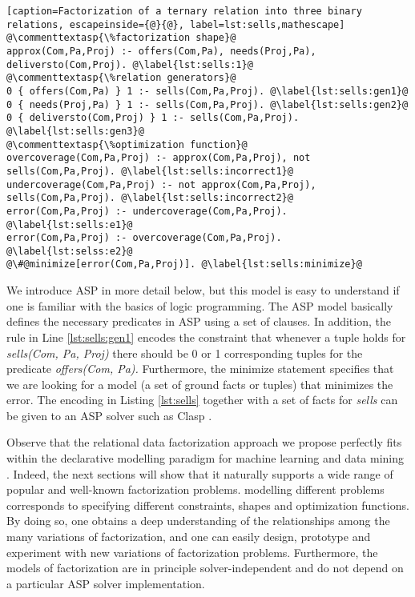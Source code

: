 \begin{lstlisting}[caption=Factorization of a ternary relation into three binary relations, escapeinside={@}{@}, label=lst:sells,mathescape] 
@\commenttextasp{\%factorization shape}@
approx(Com,Pa,Proj) :- offers(Com,Pa), needs(Proj,Pa), deliversto(Com,Proj). @\label{lst:sells:1}@
@\commenttextasp{\%relation generators}@
0 { offers(Com,Pa) } 1 :- sells(Com,Pa,Proj). @\label{lst:sells:gen1}@
0 { needs(Proj,Pa) } 1 :- sells(Com,Pa,Proj). @\label{lst:sells:gen2}@
0 { deliversto(Com,Proj) } 1 :- sells(Com,Pa,Proj). @\label{lst:sells:gen3}@
@\commenttextasp{\%optimization function}@
overcoverage(Com,Pa,Proj) :- approx(Com,Pa,Proj), not sells(Com,Pa,Proj). @\label{lst:sells:incorrect1}@
undercoverage(Com,Pa,Proj) :- not approx(Com,Pa,Proj), sells(Com,Pa,Proj). @\label{lst:sells:incorrect2}@
error(Com,Pa,Proj) :- undercoverage(Com,Pa,Proj). @\label{lst:sells:e1}@
error(Com,Pa,Proj) :- overcoverage(Com,Pa,Proj). @\label{lst:selss:e2}@
@\#@minimize[error(Com,Pa,Proj)]. @\label{lst:sells:minimize}@
\end{lstlisting}

We introduce ASP in more detail below, but this model is easy to understand if one is familiar with the basics of logic programming. The ASP model basically defines the necessary predicates in ASP using a set of clauses. In addition, the rule in Line \ref{lst:sells:gen1} encodes the constraint that whenever a tuple holds for \textit{sells(Com, Pa, Proj)}
there should be 0 or 1 corresponding tuples for the predicate \textit{offers(Com, Pa).}
Furthermore, the minimize statement specifies that we are looking for a model (a set of ground facts or tuples) that minimizes the error.  The encoding in Listing  \ref{lst:sells} together with a set of facts for \textit{sells}
can be given to an ASP solver such as Clasp \parencite{gebser2011potassco}. %


Observe that the relational data factorization approach we propose perfectly fits within the declarative modelling paradigm for machine learning and data mining \parencite{DeRaedtECML12}.  Indeed, the next sections will show that it naturally supports a wide range of popular and well-known factorization problems. 
modelling different problems corresponds to specifying different constraints, shapes and optimization functions.
By doing so, one obtains a deep understanding of the relationships among the many variations of factorization, 
and one can easily design, prototype and experiment with new variations of factorization problems. 
Furthermore, the models of factorization are in principle solver-independent and do not depend on a particular ASP solver implementation.   

